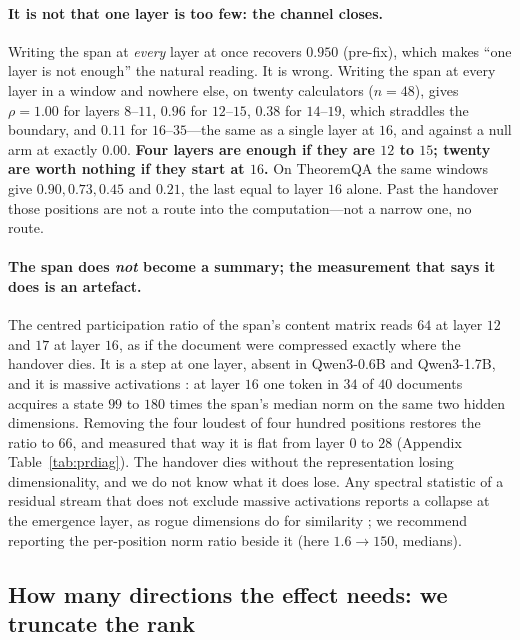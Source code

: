 \documentclass{article}
\begin{document}
\paragraph{It is not that one layer is too few: the channel closes.} Writing the
span at \emph{every} layer at once recovers $0.950$ (pre-fix), which makes ``one layer is
not enough'' the natural reading. It is wrong. Writing the span at every layer
in a window and nowhere else, on twenty calculators ($n=48$), gives
$\rho = 1.00$ for layers $8$--$11$, $0.96$ for $12$--$15$, $0.38$ for
$14$--$19$, which straddles the boundary, and $\mathbf{0.11}$ for
$16$--$35$---the same as a single layer at $16$, and against a null arm at
exactly $0.00$. \textbf{Four layers are enough if they are $12$ to $15$; twenty
are worth nothing if they start at $16$.} On TheoremQA the same windows give
$0.90, 0.73, 0.45$ and $0.21$, the last equal to layer $16$ alone. Past the
handover those positions are not a route into the computation---not a narrow
one, no route.

\paragraph{The span does \emph{not} become a summary; the measurement that says
it does is an artefact.} The centred participation ratio of the span's content
matrix reads $64$ at layer $12$ and $17$ at layer $16$, as if the document were
compressed exactly where the handover dies. It is a step at one layer, absent in
Qwen3-0.6B and Qwen3-1.7B, and it is massive activations
\citep{sun2024massive, shi2026melayer}: at layer $16$ one token in $34$ of $40$
documents acquires a state $99$ to $180$ times the span's median norm on the
same two hidden dimensions. Removing the four loudest of four hundred positions
restores the ratio to $66$, and measured that way it is flat from layer $0$ to
$28$ (Appendix Table~\ref{tab:prdiag}). The handover dies without the
representation losing dimensionality, and we do not know what it does lose. Any
spectral statistic of a residual stream that does not exclude massive
activations \citep{fernando2026residualspectral, sarkar2026causaldim} reports a
collapse at the emergence layer, as rogue dimensions do for similarity
\citep{timkey2021rogue, kovaleva2021bertbusters}; we recommend reporting the per-position norm
ratio beside it (here $1.6 \to 150$, medians).

\subsection{How many directions the effect needs: we truncate the rank}
\label{sec:rank}
\end{document}
